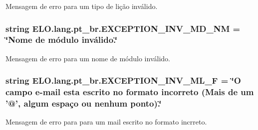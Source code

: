 Mensagem de erro para um tipo de lição inválido. 

\hypertarget{namespaceELO_1_1lang_1_1pt__br_a824cd9817e0d7ff1f01237ddcafc4b84}{
\subsubsection[{E\-X\-C\-E\-P\-T\-I\-O\-N\-\_\-\-I\-N\-V\-\_\-\-M\-D\-\_\-\-N\-M}]{\setlength{\rightskip}{0pt plus 5cm}string E\-L\-O.\-lang.\-pt\-\_\-br.\-E\-X\-C\-E\-P\-T\-I\-O\-N\-\_\-\-I\-N\-V\-\_\-\-M\-D\-\_\-\-N\-M = \char`\"{}Nome de módulo inválido.\char`\"{}}}\label{d5/d70/namespaceELO_1_1lang_1_1pt__br_a824cd9817e0d7ff1f01237ddcafc4b84}


Mensagem de erro para um nome de módulo inválido. 

\hypertarget{namespaceELO_1_1lang_1_1pt__br_a5e0ecb7f139a6c31415c68ad2b1ffaed}{
\subsubsection[{E\-X\-C\-E\-P\-T\-I\-O\-N\-\_\-\-I\-N\-V\-\_\-\-M\-L\-\_\-\-F}]{\setlength{\rightskip}{0pt plus 5cm}string E\-L\-O.\-lang.\-pt\-\_\-br.\-E\-X\-C\-E\-P\-T\-I\-O\-N\-\_\-\-I\-N\-V\-\_\-\-M\-L\-\_\-\-F = \char`\"{}O campo e-\/mail esta escrito no formato incorreto (Mais de um '@', algum espaço ou nenhum ponto).\char`\"{}}}\label{d5/d70/namespaceELO_1_1lang_1_1pt__br_a5e0ecb7f139a6c31415c68ad2b1ffaed}


Mensagem de erro para para um mail escrito no formato incrreto. 

